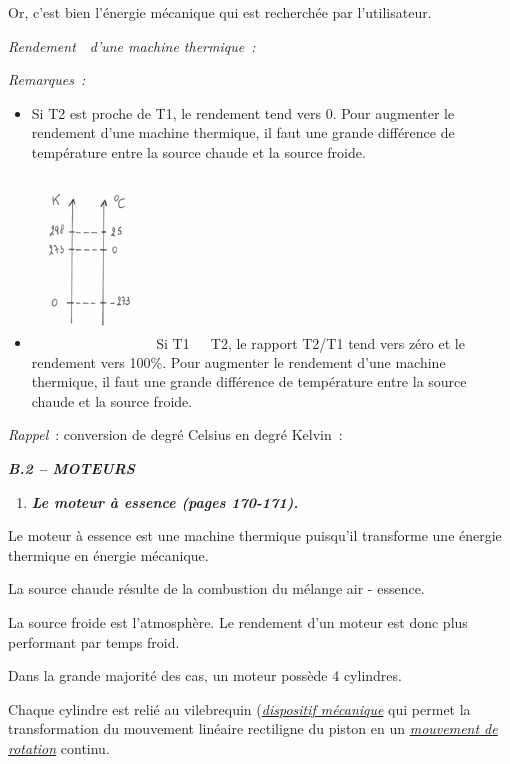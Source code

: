Or, c'est bien l'énergie mécanique qui est recherchée par l'utilisateur.

\emph{Rendement  d'une machine thermique~: }

\emph{Remarques~: }

\begin{itemize}
\tightlist
\item
  Si T2 est proche de T1, le rendement tend vers 0. Pour augmenter le
  rendement d'une machine thermique, il faut une grande différence de
  température entre la source chaude et la source froide.
\item
  \includegraphics[width=3.293cm,height=4.538cm]{Pictures/10000001000000C90000011558FC2D6C1A163765.png}Si
  T1  T2, le rapport T2/T1 tend vers zéro et le rendement vers 100\%.
  Pour augmenter le rendement d'une machine thermique, il faut une
  grande différence de température entre la source chaude et la source
  froide.
\end{itemize}

\emph{Rappel}~: conversion de degré Celsius en degré Kelvin~:

\emph{\textbf{B.2 -- MOTEURS}}

\begin{enumerate}
\def\labelenumi{\alph{enumi})}
\tightlist
\item
  \emph{\textbf{Le moteur à essence (pages 170-171). }}
\end{enumerate}

Le moteur à essence est une machine thermique puisqu'il transforme une
énergie thermique en énergie mécanique.

La source chaude résulte de la combustion du mélange air - essence.

La source froide est l'atmosphère. Le rendement d'un moteur est donc
plus performant par temps froid.

Dans la grande majorité des cas, un moteur possède 4 cylindres.

Chaque cylindre est relié au vilebrequin
(\href{https://fr.wikipedia.org/wiki/Cat\%C3\%A9gorie:Dispositif_m\%C3\%A9canique}{\emph{\emph{dispositif
mécanique}}} qui permet la transformation du mouvement linéaire
rectiligne du piston en un
\href{https://fr.wikipedia.org/wiki/Mouvement_de_rotation}{\emph{\emph{mouvement
de rotation}}} continu.

